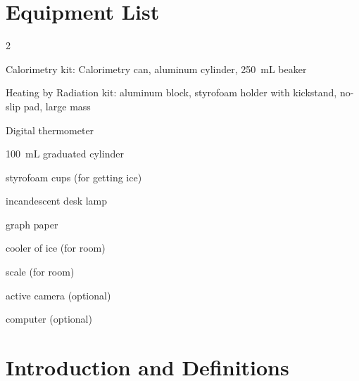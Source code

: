 

\section*{Equipment List}

\begin{multicols}{2}   %
\begin{equipment}
\item Calorimetry kit: Calorimetry can, aluminum cylinder, 250~mL beaker
\item Heating by Radiation kit: aluminum block, styrofoam holder with kickstand, no-slip pad, large mass
\item Digital thermometer
\item 100~mL graduated cylinder
\item styrofoam cups (for getting ice)
\item incandescent desk lamp
\item graph paper
\item cooler of ice (for room)
\item scale (for room)
\item active camera (optional)
\item computer (optional)
\end{equipment}
\end{multicols}


\section{Introduction and Definitions}

